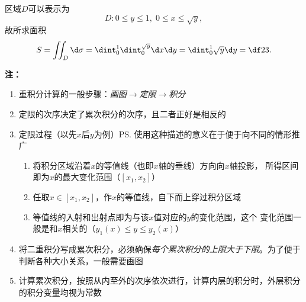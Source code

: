 \begin{center}
\end{center}

区域$D$可以表示为
$$D:0\leq y\leq 1,\;0\leq x\leq\sqrt y,$$
故所求面积
$$S=\iint_D\d\sigma=\dint_0^1\dint_0^{\sqrt y}\d x\d y
=\dint_0^1\sqrt y\d y=\df23.$$

{\bf 注：}%
\begin{enumerate}[(1)]
  \setlength{\itemindent}{1cm}
  \item 重积分计算的一般步骤：{\it 画图$\to$定限$\to$积分}
  \item 定限的次序决定了累次积分的次序，且二者正好是相反的
  \item 定限过程（以先$x$后$y$为例）\ps{使用这种描述的意义在于便于向不同的情形推广}
  \begin{enumerate}[Step-1:]
    \setlength{\itemindent}{1cm}
    \item 将积分区域沿着$x$的等值线（也即$x$轴的垂线）方向向$x$轴投影，
    所得区间即为$x$的最大变化范围（$[x_1,x_2]$）
    \item 任取$x\in[x_1,x_2]$，作$x$的等值线，自下而上穿过积分区域
    \item 等值线的入射和出射点即为与该$x$值对应的$y$的变化范围，这个
    变化范围一般是和$x$相关的（$y_1(x)\leq y\leq y_2(x)$）
  \end{enumerate}
  \item 将二重积分写成累次积分，必须确保{\it 每个累次积分的上限大于下限}。为了便于
  判断各种大小关系，一般需要画图
  \item 计算累次积分，按照从内至外的次序依次进行，计算内层的积分时，外层积分
  的积分变量均视为常数
\end{enumerate}

